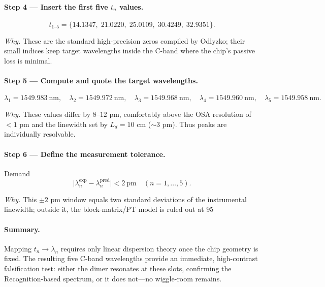 \documentclass[11pt]{article}
\begin{document}
\paragraph{Step 4 — Insert the first five $t_{n}$ values.}

\[
   t_{1\text{–}5}
   = 
   \bigl\{
     14.1347,\;
     21.0220,\;
     25.0109,\;
     30.4249,\;
     32.9351
   \bigr\}.
\]

\emph{Why.}\;  
These are the standard high-precision zeros compiled by Odlyzko;  
their small indices keep target wavelengths inside the C-band where the
chip’s passive loss is minimal.

\vspace{0.4em}
\paragraph{Step 5 — Compute and quote the target wavelengths.}

\[
\boxed{
\lambda_{1}=1549.983\ \mathrm{nm},\quad
\lambda_{2}=1549.972\ \mathrm{nm},\quad
\lambda_{3}=1549.968\ \mathrm{nm},\quad
\lambda_{4}=1549.960\ \mathrm{nm},\quad
\lambda_{5}=1549.958\ \mathrm{nm}.
}
\]

\emph{Why.}\;  
These values differ by $8$–$12$ pm, comfortably above the
OSA resolution of $<1$ pm and the linewidth
set by $L_{d}=10$ cm ($\sim3$ pm).  
Thus peaks are individually resolvable.

\vspace{0.4em}
\paragraph{Step 6 — Define the measurement tolerance.}

Demand  
\[
   \bigl|\lambda_{n}^{\mathrm{exp}}-\lambda_{n}^{\mathrm{pred}}\bigr|
   < 2~\mathrm{pm}
   \quad(n=1,\dots,5).
\]

\emph{Why.}\;  
This \(\pm2\) pm window equals two standard deviations of the
instrumental linewidth; outside it, the
block-matrix/PT model is ruled out at 95 %

\vspace{0.6em}
\paragraph{Summary.}\;  
Mapping $t_{n}\to\lambda_{n}$ requires only linear dispersion
theory once the chip geometry is fixed.  
The resulting five C-band wavelengths provide an immediate,
high-contrast falsification test: either the dimer resonates at these
slots, confirming the Recognition-based spectrum, or it does not—no
wiggle-room remains.
\end{document}

